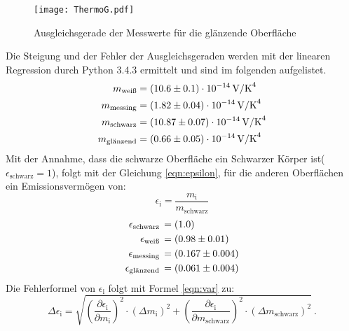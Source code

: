 \begin{figure}[H]
  \centering
  \texttt{[image: ThermoG.pdf]}
  \caption{Ausgleichsgerade der Messwerte für die glänzende Oberfläche}
  \label{fig:ThermoG}
\end{figure}
Die Steigung und der Fehler der Ausgleichsgeraden werden mit der linearen Regression durch Python 3.4.3 ermittelt und sind im folgenden aufgelistet.
\begin{align*}
  m_\text{weiß}     &= (\num{10.6 +- 0.1})   \cdot 10^{-14} \, \text{V/K}^4 \\
  m_\text{messing}  &= (\num{1.82 +- 0.04})  \cdot 10^{-14} \, \text{V/K}^4 \\
  m_\text{schwarz}  &= (\num{10.87 +- 0.07}) \cdot 10^{-14} \, \text{V/K}^4 \\
  m_\text{glänzend} &= (\num{0.66 +- 0.05})  \cdot 10^{-14} \, \text{V/K}^4 \\
\end{align*}
Mit der Annahme, dass die schwarze Oberfläche ein Schwarzer Körper ist($\epsilon_\text{schwarz} = 1$), folgt mit der Gleichung \ref{eqn:epsilon}, für die anderen Oberflächen ein Emissionsvermögen von:
\begin{equation}
  \epsilon_\text{i} = \frac{m_\text{i}}{m_\text{schwarz}}
  \label{eqn:epsilon}
\end{equation}
\begin{align*}
  \epsilon_\text{schwarz}  \, &= (\num{1.0 +- 0.0})     \\
  \epsilon_\text{weiß}     \, &= (\num{0.98 +- 0.01})   \\
  \epsilon_\text{messing}  \, &= (\num{0.167 +- 0.004}) \\
  \epsilon_\text{glänzend} \, &= (\num{0.061 +- 0.004}) \\
\end{align*}
Die Fehlerformel von $\epsilon_\text{i}$ folgt mit Formel \ref{eqn:var} zu:
\begin{equation}
  \Delta \epsilon_\text{i} = \sqrt{\left(\frac{\partial \epsilon_\text{i}}{\partial m_\text{i}} \right)^2 \cdot (\Delta m_\text{i})^2 + \left(\frac{\partial \epsilon_\text{i}}{\partial m_\text{schwarz}} \right)^2 \cdot (\Delta m_\text{schwarz})^2} \ .
\end{equation}

